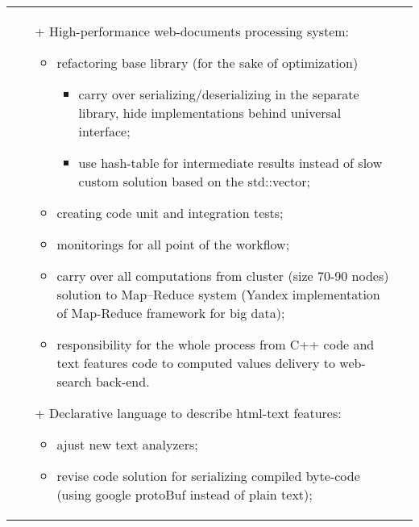 \documentclass[a4paper, 10pt]{article}
\begin{document}
\begin{longtable}{p{20mm}|p{140mm}}
\begin{itemize}[topsep = 0pt, itemsep = 0pt]
    \item[+] High-performance web-documents processing system:
        \begin{itemize}[topsep = 0pt, itemsep = 0pt]
            \item refactoring base library (for the sake of optimization)
                \begin{itemize}[topsep = 0pt, itemsep = 0pt]
                    \item carry over serializing/deserializing in the separate library, hide implementations behind universal interface;
                    \item use hash-table for intermediate results instead of slow custom solution based on the std::vector;
                \end{itemize}
            \item creating code unit and integration tests;
            \item monitorings for all point of the workflow;
            \item carry over all computations from cluster (size 70-90 nodes) solution to Map--Reduce system (Yandex implementation of Map-Reduce framework for big data);
            \item responsibility for the whole process from C++ code and text features code to computed values delivery to web-search back-end.
        \end{itemize}
    \item[+] Declarative language to describe html-text features:
    \begin{itemize}[topsep = 0pt, itemsep = 0pt]
        \item ajust new text analyzers;
        \item revise code solution for serializing compiled byte-code (using google protoBuf instead of plain text);
    \end{itemize}


\end{itemize}
\\


\end{longtable}
\end{document}
